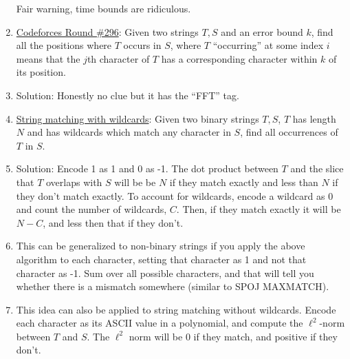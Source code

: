 \documentclass{beamer}                             %
\begin{document}
\begin{frame}
\begin{enumerate}
    Fair warning, time bounds are ridiculous.

  \item \href{https://codeforces.com/contest/528/problem/D}
    {Codeforces Round \#296}: Given two strings \( T, S \) and 
    an error bound \( k \), find all the positions where \( T \) occurs
    in \( S \), where \( T \) \enquote{occurring} at some index \( i \) 
    means that the \( j \)th character of \( T \) has a corresponding character
    within \( k \) of its position.
    \addtocounter{enumi}{-1}
  \item Solution: Honestly no clue but it has the \enquote{FFT} tag.

  \item \href{https://cs.stanford.edu/~rishig/courses/ref/l17.txt}
    {String matching with wildcards}: Given two binary strings \( T, S \),
    \( T \) has length \( N \) and has wildcards which match any character
    in \( S \), find all occurrences of \( T \) in \( S \).
    \addtocounter{enumi}{-1}
  \item Solution: Encode 1 as 1 and 0 as -1. The dot product between \( T \)
    and the slice that \( T \) overlaps with \( S \) will be be \( N \)
    if they match exactly and less than \( N \) if they don't match exactly.
    To account for wildcards, encode a wildcard as \( 0 \) and count the
    number of wildcards, \( C \). Then, if they match exactly it will be
    \( N - C \), and less then that if they don't.
    \addtocounter{enumi}{-1}
  \item This can be generalized to non-binary strings if you apply the above
    algorithm to each character, setting that character as 1 and not that
    character as -1. Sum over all possible characters, and that will tell you
    whether there is a mismatch somewhere (similar to SPOJ MAXMATCH).
    \addtocounter{enumi}{-1}
  \item This idea can also be applied to string matching without wildcards.
    Encode each character as its ASCII value in a polynomial, and compute
    the \( \ell^2 \)-norm between \( T \) and \( S \). The \( \ell^2 \) norm
    will be 0 if they match, and positive if they don't.


\end{enumerate}
\end{frame}
\end{document}
